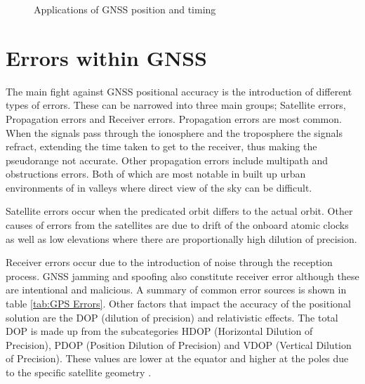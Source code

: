 \begin{figure}[h]
    \caption{Applications of GNSS position and timing \cite{RN33}}
    \label{fig:GNSS Applications}
  \end{figure}


\section{Errors within GNSS}
The main fight against GNSS positional accuracy is the introduction of different types of errors. These can be narrowed into three main groups; Satellite errors,
Propagation errors and Receiver errors. Propagation errors are most common. When the signals pass through the ionosphere and the troposphere the signals refract, extending
the time taken to get to the receiver, thus making the pseudorange not accurate. Other propagation errors include multipath and obstructions errors. Both of which are
most notable in built up urban environments of in valleys where direct view of the sky can be difficult.

Satellite errors occur when the predicated orbit differs to the actual orbit. Other causes of errors from the satellites are due to drift of the onboard atomic clocks as
well as low elevations where there are proportionally high dilution of precision.

Receiver errors occur due to the introduction of noise through the reception process. GNSS jamming and spoofing also constitute receiver error although these are
intentional and malicious. A summary of common error sources is shown in table \ref{tab:GPS Errors}.
Other factors that impact the accuracy of the positional solution are the DOP (dilution of precision) and relativistic effects. The total DOP is made up from the
subcategories HDOP (Horizontal Dilution of Precision), PDOP (Position Dilution of Precision) and VDOP (Vertical Dilution of Precision). These values are lower at the
equator and higher at the poles due to the specific satellite geometry \cite{RN62}.

